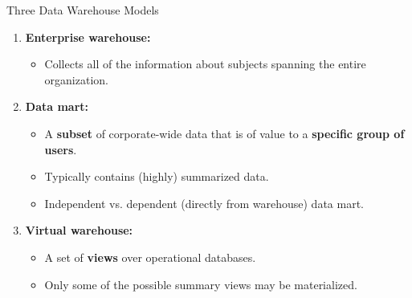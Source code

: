 \begin{frame}{Three Data Warehouse Models}
	\begin{enumerate}
		\item \textbf{\color{airforceblue}Enterprise warehouse:}
		      \begin{itemize}
			      \item Collects all of the information about subjects spanning the entire organization.
		      \end{itemize}
		\item \textbf{\color{airforceblue}Data mart:}
		      \begin{itemize}
			      \item A \textbf{\color{airforceblue}subset} of corporate-wide data that is of value to a \textbf{\color{airforceblue}specific group of users}.
			      \item Typically contains (highly) summarized data.
			      \item Independent vs. dependent (directly from warehouse) data mart.
		      \end{itemize}
		\item \textbf{\color{airforceblue}Virtual warehouse:}
		      \begin{itemize}
			      \item A set of \textbf{\color{airforceblue}views} over operational databases.
			      \item Only some of the possible summary views may be materialized.
		      \end{itemize}
	\end{enumerate}
\end{frame}

